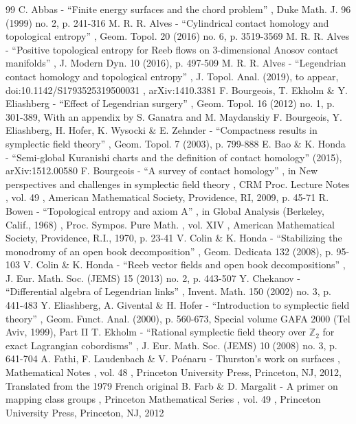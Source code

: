 \documentclass[10pt]{amsart}
\theoremstyle{plain}
\theoremstyle{definition}
\numberwithin{equation}{subsection}
\begin{document}
\begin{thebibliography}{99}
 C. Abbas - “Finite energy surfaces and the chord problem” , Duke Math. J. 96 (1999) no. 2, p. 241-316
 M. R. R. Alves - “Cylindrical contact homology and topological entropy” , Geom. Topol. 20 (2016) no. 6, p. 3519-3569
 M. R. R. Alves - “Positive topological entropy for Reeb flows on 3-dimensional Anosov contact manifolds” , J. Modern Dyn. 10 (2016), p. 497-509
 M. R. R. Alves - “Legendrian contact homology and topological entropy” , J. Topol. Anal. (2019), to appear, doi:10.1142/S1793525319500031 , arXiv:1410.3381
 F. Bourgeois, T. Ekholm \& Y. Eliashberg - “Effect of Legendrian surgery” , Geom. Topol. 16 (2012) no. 1, p. 301-389, With an appendix by S. Ganatra and M. Maydanskiy
 F. Bourgeois, Y. Eliashberg, H. Hofer, K. Wysocki \& E. Zehnder - “Compactness results in symplectic field theory” , Geom. Topol. 7 (2003), p. 799-888
 E. Bao \& K. Honda - “Semi-global Kuranishi charts and the definition of contact homology” (2015), arXiv:1512.00580
 F. Bourgeois - “A survey of contact homology” , in New perspectives and challenges in symplectic field theory , CRM Proc. Lecture Notes , vol. 49 , American Mathematical Society, Providence, RI, 2009, p. 45-71
 R. Bowen - “Topological entropy and axiom A” , in Global Analysis (Berkeley, Calif., 1968) , Proc. Sympos. Pure Math. , vol. XIV , American Mathematical Society, Providence, R.I., 1970, p. 23-41
 V. Colin \& K. Honda - “Stabilizing the monodromy of an open book decomposition” , Geom. Dedicata 132 (2008), p. 95-103
 V. Colin \& K. Honda - “Reeb vector fields and open book decompositions” , J. Eur. Math. Soc. (JEMS) 15 (2013) no. 2, p. 443-507
 Y. Chekanov - “Differential algebra of Legendrian links” , Invent. Math. 150 (2002) no. 3, p. 441-483
 Y. Eliashberg, A. Givental \& H. Hofer - “Introduction to symplectic field theory” , Geom. Funct. Anal. (2000), p. 560-673, Special volume GAFA 2000 (Tel Aviv, 1999), Part II
 T. Ekholm - “Rational symplectic field theory over $\mathbb{Z}_2$ for exact Lagrangian cobordisms” , J. Eur. Math. Soc. (JEMS) 10 (2008) no. 3, p. 641-704
 A. Fathi, F. Laudenbach \& V. Poénaru - Thurston’s work on surfaces , Mathematical Notes , vol. 48 , Princeton University Press, Princeton, NJ, 2012, Translated from the 1979 French original
 B. Farb \& D. Margalit - A primer on mapping class groups , Princeton Mathematical Series , vol. 49 , Princeton University Press, Princeton, NJ, 2012

\end{thebibliography}
\end{document}
